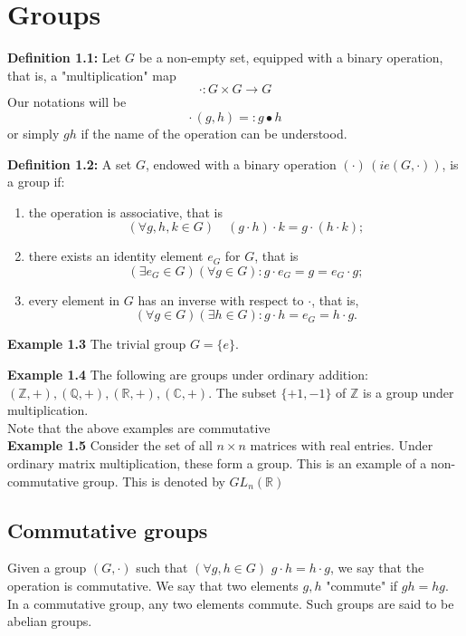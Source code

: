 

\section*{Groups} %

\textbf{Definition 1.1:} Let $G$ be a non-empty set, equipped with a binary operation, that is, a "multiplication" map %
$$ \boldsymbol{\cdot} : G \times G \longrightarrow G$$ %
Our notations will be %
$$ \boldsymbol{\cdot} \, (g,h) =: g \bullet h$$ %
or simply $gh$ if the name of the operation can be understood. %

\textbf{Definition 1.2:} A set $G$, endowed with a binary operation $( \cdot ) \, (ie (G,\cdot)) $, is a group if: %
\begin{enumerate}
    \item[i)] the operation is associative, that is %
    $$(\forall g,h,k \in G) \quad (g \cdot h) \cdot k = g \cdot (h \cdot k);$$ %
    \item[ii)] there exists an identity element $e_G$ for $G$, that is %
    $$(\exists e_G \in G)(\forall g \in G): g \cdot e_G = g = e_G \cdot g;$$ %
    \item[iii)] every element in $G$ has an inverse with respect to $\cdot$, that is, %
    $$(\forall g \in G)(\exists h \in G): g \cdot h = e_G = h \cdot g.$$ %
\end{enumerate}

\textbf{Example 1.3} %
The trivial group $G = \{e\}$. %

\textbf{Example 1.4} %
The following are groups under ordinary addition: $(\mathbb{Z}, +), (\mathbb{Q}, +), (\mathbb{R}, +), (\mathbb{C}, +)$. %
The subset $\{+1, -1\}$ of $\mathbb{Z}$ is a group under multiplication. %
\\Note that the above examples are commutative \\
\textbf{Example 1.5} %
Consider the set of all $n \times n$ matrices with real entries. %
Under ordinary matrix multiplication, these form a group. %
This is an example of a non-commutative group. This is denoted by $GL_n(\mathbb{R})$ %

\subsection*{Commutative groups} %

Given a group $(G, \cdot)$ such that $(\forall g, h \in G)$ $g \cdot h = h \cdot g$, we say that the operation is commutative. %
We say that two elements $g, h$ "commute" if $gh = hg$. %
In a commutative group, any two elements commute. Such groups are said to be abelian groups. %

